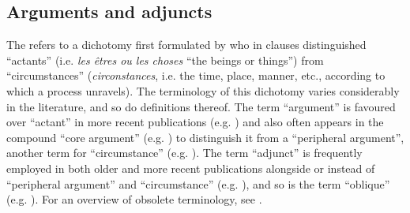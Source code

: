 \subsection{Arguments and adjuncts} \label{arguments-adjuncts}
The  refers to a dichotomy first formulated by \citet[102]{tesniere:1959} who in clauses distinguished “actants” (i.e. \textit{les êtres ou les choses} “the beings or things”) from “circumstances” (\textit{circonstances}, i.e. the time, place, manner, etc., according to which a process unravels). The terminology of this dichotomy varies considerably in the literature, and so do definitions thereof. The term “argument” is favoured over “actant” in more recent publications (e.g. \citealt{comrie:1993, kazenin:1994, dik:1997, croft:2001, croft:2012, haspelmath:muller-bardey:2004, kulikov:2010, wichmann:2014, haspelmath:hartmann:2015}) and also often appears in the compound “core argument” (e.g. \citealt{dixon:2000, dixon:aikhenvald:2000, kazenin:2001a, van-valin:2001, van-valin:2005, peterson:2007, malchukov:2015, malchukov:2016}) to distinguish it from a “peripheral argument”, another term for “circumstance” (e.g. \citealt{dixon:2000, dixon:aikhenvald:2000, peterson:2007, malchukov:2016}). The term “adjunct” is frequently employed in both older and more recent publications alongside or instead of “peripheral argument” and “circumstance” (e.g. \citealt{vater:1978, comrie:1993, croft:2001, croft:2012, van-valin:2001, van-valin:2005, peterson:2007, wichmann:2014, haspelmath:hartmann:2015, malchukov:2015}), and so is the term “oblique” (e.g. \citealt{cooreman:1994, kazenin:1994, kazenin:2001a, haspelmath:muller-bardey:2004, peterson:2007, kulikov:2010, malchukov:2015}). For an overview of obsolete terminology, see \citet[508]{somers:1984}. 

